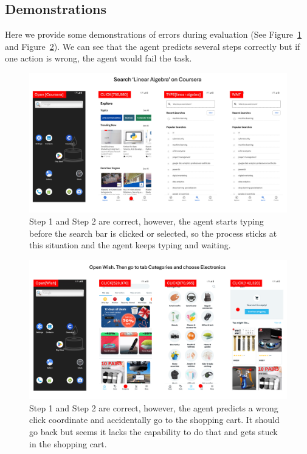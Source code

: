 \documentclass[11pt]{article}
\begin{document}
\subsection{Demonstrations}

Here we provide some demonstrations of errors during evaluation (See Figure~\ref{fig:demo-1} and Figure~\ref{fig:demo-2}). We can see that the agent predicts several steps correctly but if one action is wrong, the agent would fail the task. 

\begin{figure}
    \centering
    \includegraphics[width=0.97\linewidth]{images/demo-1.png}
    \caption{Step 1 and Step 2 are correct, however, the agent starts typing before the search bar is clicked or selected, so the process sticks at this situation and the agent keeps typing and waiting.}
    \label{fig:demo-1}
\end{figure}

\begin{figure}
    \centering
    \includegraphics[width=0.97\linewidth]{images/demo-2.png}
    \caption{Step 1 and Step 2 are correct, however, the agent predicts a wrong click coordinate and accidentally go to the shopping cart. It should go back but seems it lacks the capability to do that and gets stuck in the shopping cart.}
    \label{fig:demo-2}
\end{figure}
\end{document}
